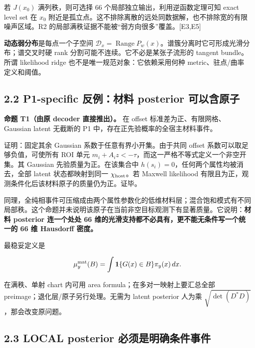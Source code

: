 \documentclass[
  11pt,
  a4paper,
]{article}
\begin{document}
若 \(J(x_0)\) 满列秩，则可选择 66 个局部独立输出，利用逆函数定理可知
exact level set 在 \(x_0\)
附近是孤立点。这不排除离散的远处同数据解，也不排除宽的有限噪声区域。R2
的局部满秩证据不能被``弱方向很多''覆盖。{[}E3,E5{]}

\textbf{动态弱分布}是每点一个子空间
\(\mathcal{D}_x=\operatorname{Range}P_w(x)\)。谱簇分离时它可形成光滑分布；谱交叉时硬
rank 分割可能不连续。它不必是某张子流形的 tangent bundle。所谓
likelihood ridge 也不是唯一规范对象：它依赖采用何种
metric、驻点/曲率定义和阈值。

\hypertarget{p1-specific-ux53cdux4f8bux6750ux6599-posterior-ux53efux4ee5ux542bux539fux5b50}{%
\subsection{2.2 P1-specific 反例：材料 posterior
可以含原子}\label{p1-specific-ux53cdux4f8bux6750ux6599-posterior-ux53efux4ee5ux542bux539fux5b50}}

\textbf{命题 T1（由原 decoder 直接推出）。} 在 offset
标准差为正、有限网格、Gaussian latent 无截断的 P1
中，存在正先验概率的全宿主材料事件。

证明：固定其余 Gaussian 系数于任意有界小开集。由于共同 offset
系数可以取足够负值，可使所有 ROI 单元
\(m_i+A_i z<-\tau\)，而这一严格不等式定义一个非空开集。其 Gaussian
先验质量为正。在该集合中 \(h(s_i)=0\)，任何两个属性均被消去，全部 latent
状态都映射到同一 \(\chi_{\rm host}\)。若 Maxwell likelihood
有限且为正，观测条件化后该材料原子的质量仍为正。证毕。

同理，全纯相事件可压缩成由两个属性参数化的低维材料层；混合饱和模式有不同局部秩。这个命题并未说明该原子在当前非空目标观测下有显著质量。它说明：\textbf{材料
posterior 连一个处处 66 维的光滑支持都不必具有，更不能无条件写一个统一的
66 维 Hausdorff 密度。}

最稳妥定义是

\[\mu_y^{\rm mat}(B)=\int\mathbf1\{G(x)\in B\}\pi_y(x)\,dx.\]

在满秩、单射 chart 内可用 area formula；在多对一映射上要汇总全部
preimage；退化层/原子另行处理。无需为 latent posterior 人为乘
\(\sqrt{\det(D^*D)}\)，那会改变原问题。

\hypertarget{local-posterior-ux5fc5ux987bux662fux660eux786eux6761ux4ef6ux4e8bux4ef6}{%
\subsection{2.3 LOCAL posterior
必须是明确条件事件}\label{local-posterior-ux5fc5ux987bux662fux660eux786eux6761ux4ef6ux4e8bux4ef6}}
\end{document}

